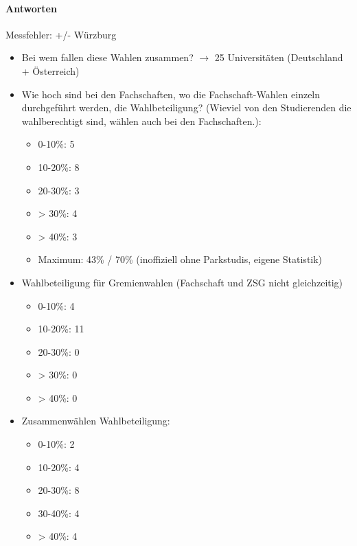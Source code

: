       \paragraph{Antworten}

        Messfehler: +/- Würzburg

        \begin{itemize}
          \item Bei wem fallen diese Wahlen zusammen?
            $\rightarrow$ 25 Universitäten (Deutschland + Österreich)

          \item Wie hoch sind bei den Fachschaften, wo die Fachschaft-Wahlen einzeln durchgeführt werden, die Wahlbeteiligung? (Wieviel von den Studierenden die wahlberechtigt sind, wählen auch bei den Fachschaften.):
            \begin{itemize}
              \item 0-10\%: 5
              \item 10-20\%: 8
              \item 20-30\%: 3
              \item > 30\%: 4
              \item > 40\%: 3
              \item Maximum: 43\% / 70\% (inoffiziell ohne Parkstudis, eigene Statistik)
            \end{itemize}

          \item Wahlbeteiligung für Gremienwahlen (Fachschaft und ZSG nicht gleichzeitig)
            \begin{itemize}
              \item 0-10\%: 4
              \item 10-20\%: 11
              \item 20-30\%: 0
              \item > 30\%: 0
              \item > 40\%: 0
            \end{itemize}

          \item Zusammenwählen Wahlbeteiligung:
            \begin{itemize}
              \item 0-10\%: 2
              \item 10-20\%: 4
              \item 20-30\%: 8
              \item 30-40\%: 4
              \item > 40\%: 4
            \end{itemize}


\end{itemize}
